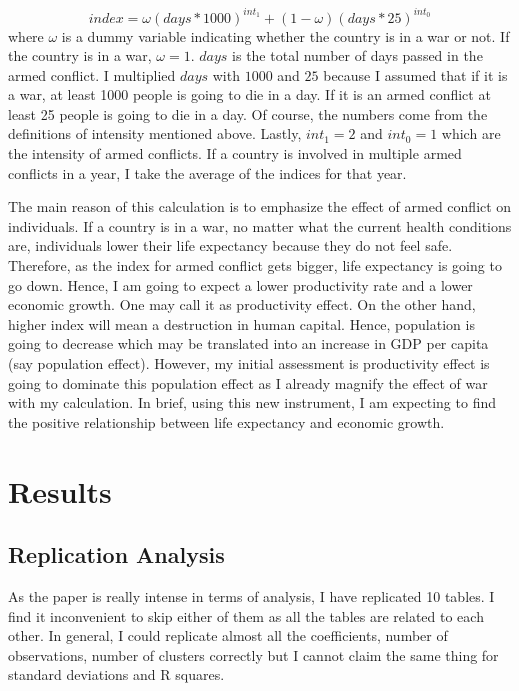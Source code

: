 \documentclass[11pt]{article}
\begin{document}
\begin{equation}
index = \omega(days*1000)^{int_{1}} + (1-\omega)(days*25)^{int_{0}}
\end{equation}
where $\omega$ is a dummy variable indicating whether the country is in a war or not. If the country is in a war, $\omega=1$. $days$ is the total number of days passed in the armed conflict. I multiplied $days$ with $1000$ and $25$ because I assumed that if it is a war, at least 1000 people is going to die in a day. If it is an armed conflict at least 25 people is going to die in a day. Of course, the numbers come from the definitions of intensity mentioned above. Lastly, $int_{1}=2$ and $int_{0}=1$ which are the intensity of armed conflicts. If a country is involved in multiple armed conflicts in a year, I take the average of the indices for that year.

The main reason of this calculation is to emphasize the effect of armed conflict on individuals. If a country is in a war, no matter what the current health conditions are, individuals lower their life expectancy because they do not feel safe. Therefore, as the index for armed conflict gets bigger, life expectancy is going to go down. Hence, I am going to expect a lower productivity rate and a lower economic growth. One may call it as productivity effect. On the other hand, higher index will mean a destruction in human capital. Hence, population is going to decrease which may be translated into an increase in GDP per capita (say population effect). However, my initial assessment is productivity effect is going to dominate this population effect as I already magnify the effect of war with my calculation. In brief, using this new instrument, I am expecting to find the positive relationship between life expectancy and economic growth. 

\section*{Results}
\subsection*{Replication Analysis}
As the paper is really intense in terms of analysis, I have replicated 10 tables. I find it inconvenient to skip either of them as all the tables are related to each other. In general, I could replicate almost all the coefficients, number of observations, number of clusters correctly but I cannot claim the same thing for standard deviations and R squares. 
\end{document}
